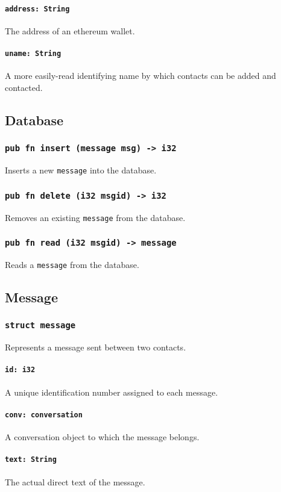 \documentclass[]{article}
\begin{document}
\paragraph{\texttt{address: String}}
The address of an ethereum wallet.
\paragraph{\texttt{uname: String}}
A more easily-read identifying name by which contacts can be added and contacted.
\subsection{Database}
\subsubsection{\texttt{pub fn insert (message msg) -> i32}}
Inserts a new \verb!message! into the database.
\subsubsection{\texttt{pub fn delete (i32 msgid) -> i32}}
Removes an existing \verb!message! from the database.
\subsubsection{\texttt{pub fn read (i32 msgid) -> message}}
Reads a \verb!message! from the database.
\subsection{Message}
\subsubsection{\texttt{struct message}}
Represents a message sent between two contacts.
\paragraph{\texttt{id: i32}}
A unique identification number assigned to each message.
\paragraph{\texttt{conv: conversation}}
A conversation object to which the message belongs.
\paragraph{\texttt{text: String}}
The actual direct text of the message.
\end{document}
